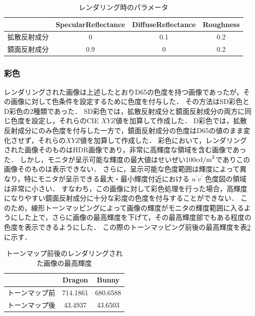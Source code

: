                 \begin{table}[h]
                    \centering
                    \caption{レンダリング時のパラメータ}
                    \begin{tabular}{|l||c|c|c|} \hline
                                               & SpecularReflectance & DiffuseReflectance & Roughness \\ \hline \hline
                        拡散反射成分           & 0                   & 0.1                & 0.2 \\ \hline
                        鏡面反射成分           & 0.9                 & 0                  & 0.2 \\ \hline
                    \end{tabular}
                    \label{render_param}
                \end{table}
            
            \subsubsection{彩色}
                レンダリングされた画像は上述したとおりD65の色度を持つ画像であったが，その画像に対して色条件を設定するために色度を付与した．
                その方法はSD彩色とD彩色の2種類であった．
                SD彩色では，拡散反射成分と鏡面反射成分の両方に同じ色度を設定し，それらのCIE $XYZ$値を加算して作成した．
                D彩色では，拡散反射成分にのみ色度を付与した一方で，鏡面反射成分の色度はD65の値のまま変化させず，それらの$XYZ$値を加算して作成した．
                彩色において，レンダリングされた画像そのものはHDR画像であり，非常に高輝度な領域を含む画像であった．
                しかし，モニタが呈示可能な輝度の最大値はせいぜい100${\rm cd/m}^2$でありこの画像そのものは表示できない．
                さらに，呈示可能な色度範囲は輝度によって異なり，特にモニタが呈示できる最大・最小輝度付近における $u^{\prime}v^{\prime}$ 色度図の領域は非常に小さい．
                すなわち，この画像に対して彩色処理を行った場合，高輝度になりやすい鏡面反射成分に十分な彩度の色度を付与することができない．
                このため，線形トーンマッピングによって画像の輝度がモニタの輝度範囲に入るようにした上で，さらに画像の最高輝度を下げて，その最高輝度部でもある程度の色度を表示できるようにした．
                この際のトーンマッピング前後の最高輝度を表\ref{tonemap}に示す．

                \begin{table}[h]
                    \centering
                    \caption{トーンマップ前後のレンダリングされた画像の最高輝度}
                    \begin{tabular}{|l||c|c|} \hline
                                               & Dragon              & Bunny              \\ \hline \hline
                        トーンマップ前         & 714.1861            & 680.6588           \\ \hline
                        トーンマップ後         & 43.4937             & 43.6503            \\ \hline
                    \end{tabular}
                    \label{tonemap}
                \end{table}

